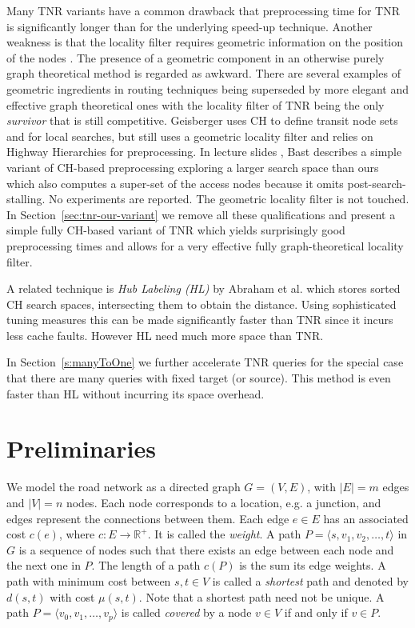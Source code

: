 \documentclass{llncs}
\newcommand{\etal}{et al.\xspace}
\begin{document}
Many TNR variants have a common drawback that preprocessing time for TNR is significantly longer than for the underlying speed-up technique. 
Another weakness is that the locality filter requires geometric information on the position of the nodes \cite{bfm-trans-06,bfmss-itcsp-07,g-ch-08}. 
The presence of a geometric component in an otherwise purely graph theoretical method is regarded as awkward. 
There are several examples of geometric ingredients in routing techniques being superseded by more elegant and effective graph theoretical ones \cite{s-rprn-08,dssw-erpa-09} with the locality filter of TNR being the only \textit{survivor} that is still competitive.
Geisberger \cite{g-ch-08} uses CH to define transit node sets and for local searches, but still uses a geometric locality filter and relies on Highway Hierarchies \cite{ss-ehh-12} for preprocessing. 
In lecture slides \cite{Bast11}, Bast
describes a simple variant of CH-based preprocessing exploring a larger search space than ours which also computes a super-set of the access nodes because it omits post-search-stalling. No experiments are reported. The geometric locality filter is not touched. In Section~\ref{sec:tnr-our-variant} we remove all these qualifications and present a simple fully CH-based variant of TNR which yields surprisingly good preprocessing times and allows for a very effective fully graph-theoretical locality filter.


A related technique is \textit{Hub Labeling (HL)} by Abraham \etal \cite{adgw-ahbla-11} which stores sorted CH search spaces, intersecting them to obtain the distance. 
Using sophisticated tuning measures this can be made significantly faster than TNR since it incurs less cache faults. However HL need much more space than TNR. 



In Section~\ref{s:manyToOne} we further accelerate TNR queries for the special case that there are many queries with fixed target (or source). This method is even faster than HL without incurring its space overhead.

\section{Preliminaries}\label{sec:tnr-preliminaries}
We model the road network as a directed graph $G=(V,E)$, with $\vert E \vert=m$ edges and $\vert V\vert=n$ nodes.
Each node corresponds to a location, e.g. a junction, and edges represent the connections between them.
Each edge $e\in E$ has an associated cost $c(e)$, where $c:E\rightarrow \mathbb{R}^+$.
It is called the \textit{weight}.
A path $P=\langle s,v_1, v_2, \dotsc,t\rangle$ in $G$ is a sequence of nodes such that there exists an edge between each node and the next one in $P$.
The length of a path $c(P)$ is the sum its edge weights.
A path with minimum cost between $s,t\in V$ is called a \textit{shortest} path and denoted by $d(s,t)$ with cost $\mu(s,t)$. 
Note that a shortest path need not be unique.
A path $P=\langle v_0, v_1, \dotsc, v_p\rangle$ is called \textit{covered} by a node $v\in V$ if and only if $v \in P$. 
\end{document}
